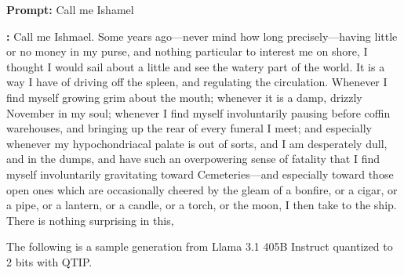 \begin{tcolorbox}
\textbf{Prompt:}  Call me Ishamel
\vspace{1em}

\textbf{\qt:}   
Call me Ishmael. Some years ago—never mind how long precisely—having little or no money in my purse, and nothing particular to interest me on shore, I thought I would sail about a little and see the watery part of the world. It is a way I have of driving off the spleen, and regulating the circulation. Whenever I find myself growing grim about the mouth; whenever it is a damp, drizzly November in my soul; whenever I find myself involuntarily pausing before coffin warehouses, and bringing up the rear of every funeral I meet; and especially whenever my hypochondriacal palate is out of sorts, and I am desperately dull, and in the dumps, and have such an overpowering sense of fatality that I find myself involuntarily gravitating toward Cemeteries—and especially toward those open ones which are occasionally cheered by the gleam of a bonfire, or a cigar, or a pipe, or a lantern, or a candle, or a torch, or the moon, I then take to the ship. There is nothing surprising in this,
\end{tcolorbox}


The following is a sample generation from Llama 3.1 405B Instruct quantized to 2 bits with QTIP. 

